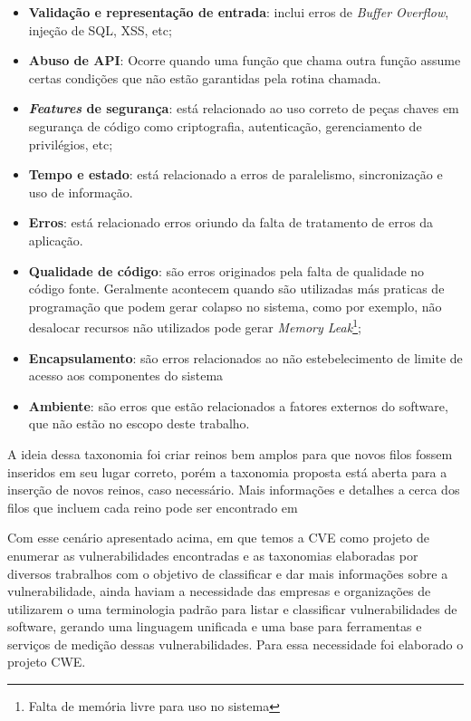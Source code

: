 \begin{itemize}
\item \textbf{Validação e representação de entrada}: inclui erros de \emph{Buffer Overflow}, injeção de SQL, XSS, etc;
\item \textbf{Abuso de API}: Ocorre quando uma função que chama outra função assume certas condições que não estão garantidas pela rotina chamada.
\item \textbf{\emph{Features} de segurança}: está relacionado ao uso correto de peças chaves em segurança de código como criptografia, autenticação, gerenciamento de privilégios, etc;
\item \textbf{Tempo e estado}: está relacionado a erros de paralelismo, sincronização e uso de informação.
\item \textbf{Erros}: está relacionado erros oriundo da falta de tratamento de erros da aplicação.
\item \textbf{Qualidade de código}: são erros originados pela falta de qualidade no código fonte. Geralmente acontecem quando são utilizadas más praticas de programação que podem gerar colapso no sistema, como por exemplo, não desalocar recursos não utilizados pode gerar \emph{Memory Leak}\footnote{Falta de memória livre para uso no sistema};
\item \textbf{Encapsulamento}: são erros relacionados ao não estebelecimento de limite de acesso aos componentes do sistema
\item \textbf{Ambiente}: são erros que estão relacionados a fatores externos do software, que não estão no escopo deste trabalho.

\end{itemize}

A ideia dessa taxonomia foi criar reinos bem amplos para que novos filos fossem inseridos em seu lugar correto, porém a taxonomia proposta está aberta para a inserção de novos reinos, caso necessário. Mais informações e detalhes a cerca dos filos que incluem cada reino pode ser encontrado em \cite{tsipenyuk2005}

%
Com esse cenário apresentado acima, em que temos a CVE como projeto de enumerar as vulnerabilidades encontradas e as taxonomias elaboradas por diversos trabralhos com o objetivo de classificar e dar mais informações sobre a vulnerabilidade, ainda haviam a necessidade das empresas e organizações de utilizarem o uma terminologia padrão para listar e classificar vulnerabilidades de software, gerando uma linguagem unificada e uma base para ferramentas e serviços de medição dessas vulnerabilidades. Para essa necessidade foi elaborado o projeto CWE.


